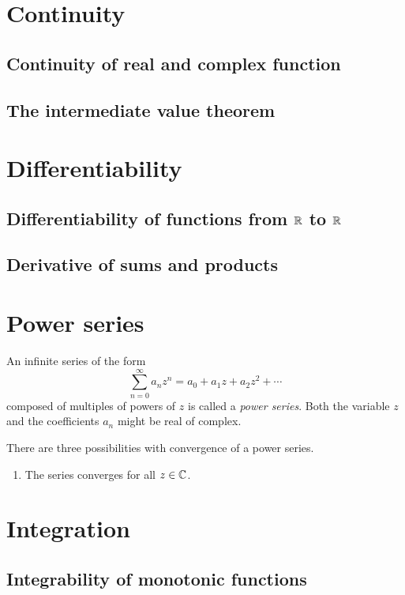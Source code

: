 \documentclass[main.tex]{subfiles}
\begin{document}
	\section{Continuity}
	\subsection{Continuity of real and complex function}
	
	\subsection{The intermediate value theorem}
	
	\section{Differentiability}
	\subsection{Differentiability of functions from $\mathbb R$ to $\mathbb R$}
	
	\subsection{Derivative of sums and products}
	
	\section{Power series}
	\begin{definition}
		An infinite series of the form
		\begin{equation*}
		\sum_{n = 0}^{\infty} a_n z^n = a_0 + a_1 z + a_2 z^2 + \cdots
		\end{equation*}
		composed of multiples of powers of $z$ is called a \textit{power series}. Both the variable $z$ and the coefficients $a_n$ might be real of complex.
	\end{definition}
	There are three possibilities with convergence of a power series.
	\begin{enumerate}
		\item The series converges for all $z \in \mathbb C$.
		
	\end{enumerate}
	
	\section{Integration}
	\subsection{Integrability of monotonic functions}
	
\end{document}
